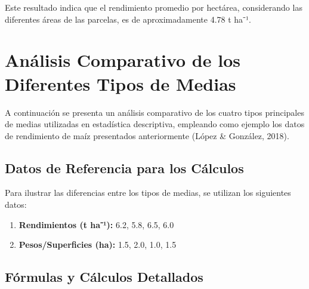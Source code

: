 \documentclass[
  spanish,
  letterpaper,
]{book}
\begin{document}
Este resultado indica que el rendimiento promedio por hectárea,
considerando las diferentes áreas de las parcelas, es de aproximadamente
4.78 t ha⁻¹.

\section{Análisis Comparativo de los Diferentes Tipos de
Medias}\label{anuxe1lisis-comparativo-de-los-diferentes-tipos-de-medias}

A continuación se presenta un análisis comparativo de los cuatro tipos
principales de medias utilizadas en estadística descriptiva, empleando
como ejemplo los datos de rendimiento de maíz presentados anteriormente
(López \& González, 2018).

\subsection{Datos de Referencia para los
Cálculos}\label{datos-de-referencia-para-los-cuxe1lculos}

Para ilustrar las diferencias entre los tipos de medias, se utilizan los
siguientes datos:

\begin{enumerate}
\def\labelenumi{\arabic{enumi}.}
\item
  \textbf{Rendimientos (t ha⁻¹):} 6.2, 5.8, 6.5, 6.0
\item
  \textbf{Pesos/Superficies (ha):} 1.5, 2.0, 1.0, 1.5
\end{enumerate}

\subsection{Fórmulas y Cálculos
Detallados}\label{fuxf3rmulas-y-cuxe1lculos-detallados}
\end{document}
